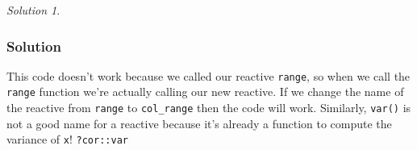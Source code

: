 \documentclass[
]{book}
\newenvironment{Shaded}{\begin{snugshade}}{\end{snugshade}}
\newcommand{\AttributeTok}[1]{\textcolor[rgb]{0.77,0.63,0.00}{#1}}
\newcommand{\ConstantTok}[1]{\textcolor[rgb]{0.00,0.00,0.00}{#1}}
\newcommand{\ControlFlowTok}[1]{\textcolor[rgb]{0.13,0.29,0.53}{\textbf{#1}}}
\newcommand{\FunctionTok}[1]{\textcolor[rgb]{0.00,0.00,0.00}{#1}}
\newcommand{\NormalTok}[1]{#1}
\newcommand{\OtherTok}[1]{\textcolor[rgb]{0.56,0.35,0.01}{#1}}
\newcommand{\SpecialCharTok}[1]{\textcolor[rgb]{0.00,0.00,0.00}{#1}}
\newcommand{\StringTok}[1]{\textcolor[rgb]{0.31,0.60,0.02}{#1}}
\theoremstyle{definition}
\theoremstyle{definition}
\theoremstyle{definition}
\theoremstyle{definition}
\theoremstyle{remark}
\newtheorem*{solution}{Solution}
\begin{document}
\begin{solution}
\leavevmode

\hypertarget{solution-16}{%
\subsubsection*{Solution}\label{solution-16}}

This code doesn't work because we called our reactive \texttt{range}, so when we call the \texttt{range} function we're actually calling our new reactive. If we change the name of the reactive from \texttt{range} to \texttt{col\_range} then the code will work. Similarly, \texttt{var()} is not a good name for a reactive because it's already a function to compute the variance of \texttt{x}! \texttt{?cor::var}

\begin{Shaded}
\end{Shaded}

\end{solution}
\end{document}
